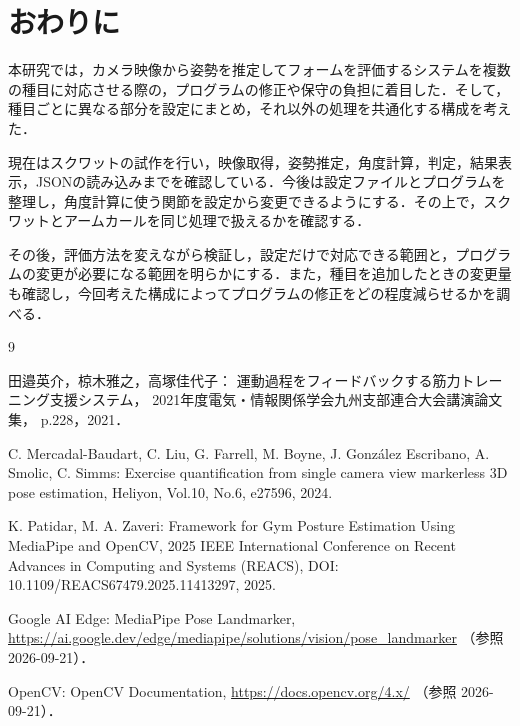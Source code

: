 \documentclass[no-page-number]{nanzan-abstract}
\begin{document}
\section{おわりに}

本研究では，カメラ映像から姿勢を推定してフォームを評価するシステムを複数の種目に対応させる際の，プログラムの修正や保守の負担に着目した．そして，種目ごとに異なる部分を設定にまとめ，それ以外の処理を共通化する構成を考えた．

現在はスクワットの試作を行い，映像取得，姿勢推定，角度計算，判定，結果表示，JSONの読み込みまでを確認している．今後は設定ファイルとプログラムを整理し，角度計算に使う関節を設定から変更できるようにする．その上で，スクワットとアームカールを同じ処理で扱えるかを確認する．

その後，評価方法を変えながら検証し，設定だけで対応できる範囲と，プログラムの変更が必要になる範囲を明らかにする．また，種目を追加したときの変更量も確認し，今回考えた構成によってプログラムの修正をどの程度減らせるかを調べる．


\begin{thebibliography}{9}
\small
\setlength{\itemsep}{0pt}

田邉英介，椋木雅之，高塚佳代子：
運動過程をフィードバックする筋力トレーニング支援システム，
2021年度電気・情報関係学会九州支部連合大会講演論文集，
p.228，2021．

C. Mercadal-Baudart, C. Liu, G. Farrell, M. Boyne,
J. González Escribano, A. Smolic, C. Simms:
Exercise quantification from single camera view markerless 3D pose estimation,
Heliyon, Vol.10, No.6, e27596, 2024.

K. Patidar, M. A. Zaveri:
Framework for Gym Posture Estimation Using MediaPipe and OpenCV,
2025 IEEE International Conference on Recent Advances in Computing and Systems (REACS),
DOI: 10.1109/REACS67479.2025.11413297, 2025.

Google AI Edge: MediaPipe Pose Landmarker,
\url{https://ai.google.dev/edge/mediapipe/solutions/vision/pose_landmarker}
（参照 2026-09-21）．

OpenCV: OpenCV Documentation,
\url{https://docs.opencv.org/4.x/}
（参照 2026-09-21）．

\end{thebibliography}
\end{document}
